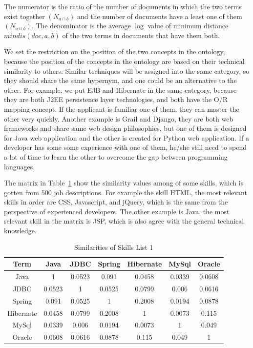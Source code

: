 The numerator is the ratio of the number of documents in which the two terms exist together $(N_{a \cap b})$ and the number of documents have a least one of them $(N_{a \cup b})$. The denominator is the average $\log$ value of minimum distance $mindis(doc,a,b)$ of the two terms in documents that have them both.

We set the restriction on the position of the two concepts in the ontology, because the position of the concepts in the ontology are based on their technical similarity to others. Similar techniques will be assigned into the same category, so they should share the same hypernym, and one could be an alternative to the other. For example, we put EJB and Hibernate in the same category, because they are both J2EE persistence layer technologies, and both have the O/R mapping concept. If the applicant is familiar one of them, they can master the other very quickly. Another example is Grail and Django, they are both web frameworks and share same web design philosophies, but one of them is designed for Java web application and the other is created for Python web application. If a developer has some some experience with one of them, he/she still need to spend a lot of time to learn the other to overcome the gap between programming languages.

The matrix in Table~\ref{tab:dismatrix1} show the similarity values among of some skills, which is gotten from 500 job descriptions. For example the skill HTML, the most relevant skills in order are CSS, Javascript, and jQuery,  which is the same from the perspective of experienced developers. The other example is Java, the most relevant skill in the matrix is JSP, which is also agree with the general technical knowledge.


\begin{table}

\caption{Similarities of Skills List 1}
\begin{tabular}{ c | c c c c c c   }
 \hline
  Term       &  Java  &  JDBC  & Spring & Hibernate & MySql  & Oracle   \\  \hline
  Java   &   1    & 0.0523 & 0.091  &   0.0458  & 0.0339 & 0.0608    \\  \hline
    JDBC   & 0.0523 &   1    & 0.0525 &   0.0799  & 0.006  & 0.0616   \\  \hline
   Spring  & 0.091  & 0.0525 &   1    &   0.2008  & 0.0194 & 0.0878   \\  \hline
 Hibernate & 0.0458 & 0.0799 & 0.2008 &     1     & 0.0073 & 0.115    \\  \hline
   MySql   & 0.0339 & 0.006  & 0.0194 &   0.0073  &   1    & 0.049    \\  \hline
   Oracle  & 0.0608 & 0.0616 & 0.0878 &   0.115   & 0.049  &   1      \\  \hline
 \hline
\end{tabular}
\label{tab:dismatrix1}
\end{table}


